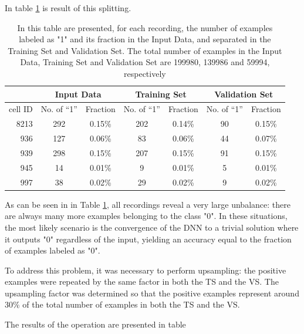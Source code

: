 \documentclass{article}
\begin{document}
In table \ref{table:summary-beforeUS} is result of this splitting.
\begin{table}[htbp]
\begin{center}
\begin{tabular}{r|cc|cc|cc}
\multicolumn{1}{l|}{} & \multicolumn{ 2}{c|}{Input Data} & \multicolumn{ 2}{c|}{Training Set} & \multicolumn{ 2}{c}{Validation Set} \\ \hline
cell ID & No. of “1”  & Fraction & No. of “1”  & Fraction & No. of “1” & Fraction \\ \hline
8213 & 292 & 0.15\% & 202 & 0.14\% & 90 & 0.15\% \\ 
936 & 127 & 0.06\% & 83 & 0.06\% & 44 & 0.07\% \\ 
939 & 298 & 0.15\% & 207 & 0.15\% & 91 & 0.15\% \\ 
945 & 14 & 0.01\% & 9 & 0.01\% & 5 & 0.01\% \\ 
997 & 38 & 0.02\% & 29 & 0.02\% & 9 & 0.02\% \\ 
\end{tabular}
\end{center}
\caption{In this table are presented, for each recording, the number of examples labeled as "1" and its fraction in the Input Data, and separated in the Training Set and Validation Set. The total number of examples in the Input Data, Training Set and Validation Set are 199980, 139986 and 59994, respectively}
\label{table:summary-beforeUS}
\end{table}

As can be seen in in Table \ref{table:summary-beforeUS}, all recordings reveal a very large unbalance: there are always many more examples belonging to the class "0". In these situations, the most likely scenario is the convergence of the DNN to a trivial solution where it outputs "0" regardless of the input, yielding an accuracy equal to the fraction of examples labeled as "0".

To address this problem, it was necessary to perform upsampling: the positive examples were repeated by the same factor in both the TS and the VS. The upsampling factor was determined so that the positive examples represent around 30\% of the total number of examples in both the TS and the VS.

The results of the operation are presented in table 
\end{document}
